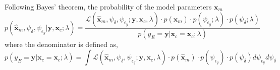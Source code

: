 Following Bayes' theorem, the probability of the model parameters $\bm{x}_m$
\begin{equation}
  p(\hat{\bm{x}}_m, \psi_\delta, \psi_{\epsilon_y} | \mathbf{y}, \mathbf{x}_c; \lambda) = \frac{\mathcal{L}(\hat{\bm{x}}_m, \psi_\delta, \psi_{\epsilon_y} ; \mathbf{y}, \mathbf{x}_c, \lambda) \cdot p(\hat{\bm{x}}_m) \cdot p(\psi_{\epsilon_y}; \lambda) \cdot p(\psi_{\delta}; \lambda)}{p(y_E = \mathbf{y} | \bm{x}_c = \mathbf{x}_c ; \lambda)}
\label{eq:bc_}
\end{equation}
where the denominator is defined as,
\begin{equation}
	p(y_E = \mathbf{y} | \bm{x}_c = \mathbf{x}_c ; \lambda) = \int \mathcal{L}(\hat{\bm{x}}_m, \psi_\delta, \psi_{\epsilon_y}; \mathbf{y}, \mathbf{x}_c, \lambda) \cdot p(\hat{\bm{x}}_m) \cdot p(\psi_{\epsilon_y}) \cdot p(\psi_{\delta}) d\psi_{\epsilon_y} d\psi_\delta
\label{eq:}
\end{equation}
